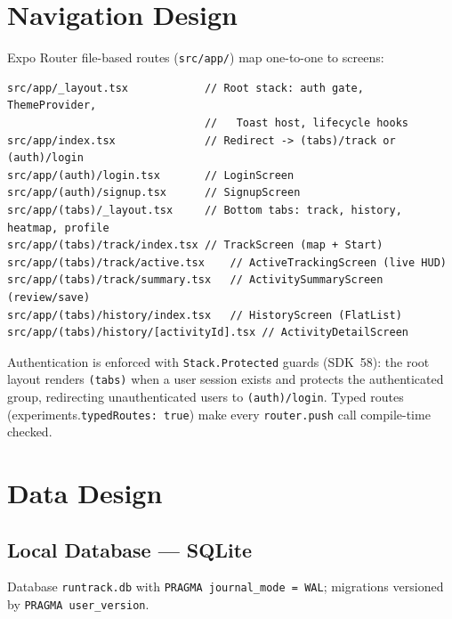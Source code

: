 \documentclass[11pt,a4paper]{report}
\begin{document}
\section{Navigation Design}
Expo Router file-based routes (\texttt{src/app/}) map one-to-one to screens:

\begin{lstlisting}[style=json, caption={Route tree (src/app/)}, label={lst:routes}]
src/app/_layout.tsx            // Root stack: auth gate, ThemeProvider,
                               //   Toast host, lifecycle hooks
src/app/index.tsx              // Redirect -> (tabs)/track or (auth)/login
src/app/(auth)/login.tsx       // LoginScreen
src/app/(auth)/signup.tsx      // SignupScreen
src/app/(tabs)/_layout.tsx     // Bottom tabs: track, history, heatmap, profile
src/app/(tabs)/track/index.tsx // TrackScreen (map + Start)
src/app/(tabs)/track/active.tsx    // ActiveTrackingScreen (live HUD)
src/app/(tabs)/track/summary.tsx   // ActivitySummaryScreen (review/save)
src/app/(tabs)/history/index.tsx   // HistoryScreen (FlatList)
src/app/(tabs)/history/[activityId].tsx // ActivityDetailScreen
\end{lstlisting}

Authentication is enforced with \texttt{Stack.Protected} guards (SDK~58): the root layout renders \texttt{(tabs)} when a user session exists and protects the authenticated group, redirecting unauthenticated users to \texttt{(auth)/login}. Typed routes (experiments.\allowbreak \texttt{typedRoutes: true}) make every \texttt{router.push} call compile-time checked.

\section{Data Design}
\subsection{Local Database --- SQLite}
Database \texttt{runtrack.db} with \texttt{PRAGMA journal\_mode = WAL}; migrations versioned by \texttt{PRAGMA user\_version}.
\end{document}
